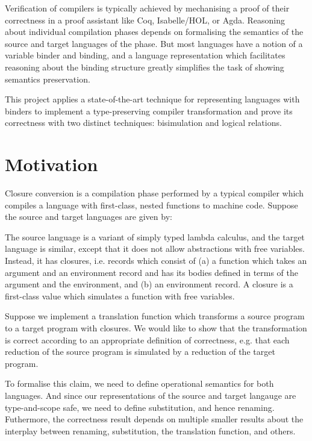 \documentclass[bsc,frontabs,oneside,singlespacing,parskip,deptreport]{infthesis}
\theoremstyle{definition}
\theoremstyle{lemma}
\begin{document}
Verification of compilers is typically achieved by mechanising a proof
of their correctness in a proof assistant like Coq, Isabelle/HOL, or
Agda. Reasoning about individual compilation phases depends on
formalising the semantics of the source and target languages of the
phase. But most languages have a notion of a variable binder and
binding, and a language representation which facilitates reasoning
about the binding structure greatly simplifies the task of showing
semantics preservation.

This project applies a state-of-the-art technique for representing
languages with binders to implement a type-preserving compiler
transformation and prove its correctness with two distinct techniques: 
bisimulation and logical relations.

\section{Motivation}
\label{sec:motivation}

Closure conversion is a compilation phase performed by a typical
compiler which compiles a language with first-class, nested functions to
machine code. Suppose the source and target languages are given by:

\begin{minipage}{.5\textwidth}
  {\centering {}}
\end{minipage}%
\begin{minipage}{.5\textwidth}
  {\centering {}}
\end{minipage}

The source language is a variant of simply typed lambda calculus, and
the target language is similar, except that it does not allow
abstractions with free variables. Instead, it has closures,
i.e. records which consist of (a) a function which takes an argument
and an environment record and has its bodies defined in terms of
the argument and the environment, and (b) an environment record. A
closure is a first-class value which simulates a function with free
variables.

Suppose we implement a translation function which transforms a source
program to a target program with closures. We would like to show that
the transformation is correct according to an appropriate definition of
correctness, e.g. that each reduction of the source program is
simulated by a reduction of the target program.

To formalise this claim, we need to define operational semantics for
both languages. And since our representations of the source and target
langauge are type-and-scope safe, we need to define substitution, and
hence renaming. Futhermore, the correctness result depends on multiple
smaller results about the interplay between renaming, substitution,
the translation function, and others.
\end{document}

